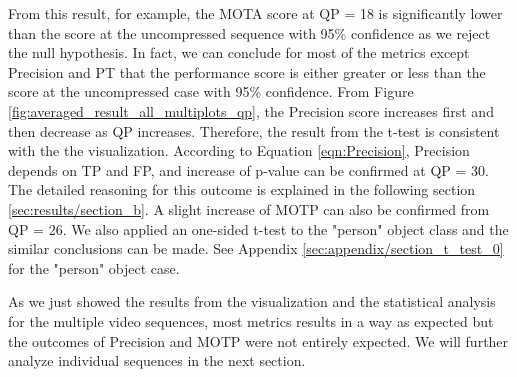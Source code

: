 
From this result, for example, the MOTA score at QP = 18 is significantly lower than the score at the uncompressed sequence with 95\% confidence as we reject the null hypothesis. In fact, we can conclude for most of the metrics except Precision and PT that the performance score is either greater or less than the score at the uncompressed case with 95\% confidence. From Figure \ref{fig:averaged_result_all_multiplots_qp}, the Precision score increases first and then decrease as QP increases. Therefore, the result from the t-test is consistent with the the visualization. According to Equation \ref{eqn:Precision}, Precision depends on TP and FP, and increase of p-value can be confirmed at QP = 30. The detailed reasoning for this outcome is explained in the following section \ref{sec:results/section_b}. A slight increase of MOTP can also be confirmed from QP = 26. We also applied an one-sided t-test to the "person" object class and the similar conclusions can be made. See Appendix \ref{sec:appendix/section_t_test_0} for the "person" object case.

As we just showed the results from the visualization and the statistical analysis for the multiple video sequences, most metrics results in a way as expected but the outcomes of Precision and MOTP were not entirely expected. We will further analyze individual sequences in the next section.


